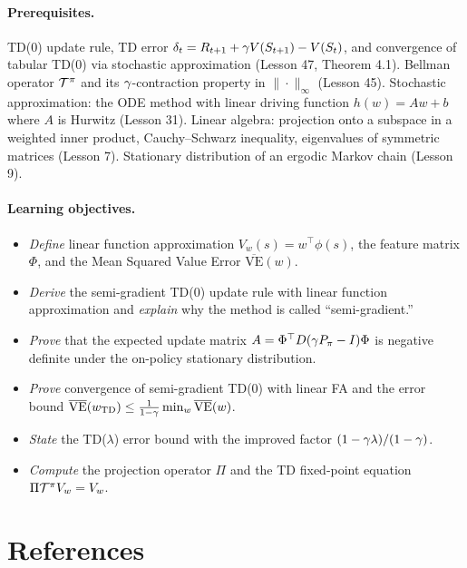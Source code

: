 \documentclass[11pt,a4paper]{article}
\begin{document}
\paragraph{Prerequisites.}
TD(0) update rule, TD error $\delta_t = R_{t+1} + \gamma V(S_{t+1})
- V(S_t)$, and convergence of tabular TD(0) via stochastic approximation
(Lesson 47, Theorem 4.1). Bellman operator $\mathcal{T}^\pi$ and its
$\gamma$-contraction property in $\|\cdot\|_\infty$ (Lesson 45).
Stochastic approximation: the ODE method with linear driving function
$h(w) = Aw + b$ where $A$ is Hurwitz (Lesson 31). Linear algebra:
projection onto a subspace in a weighted inner product, Cauchy--Schwarz
inequality, eigenvalues of symmetric matrices (Lesson 7). Stationary
distribution of an ergodic Markov chain (Lesson 9).

\paragraph{Learning objectives.}
\begin{itemize}
  \item \emph{Define} linear function approximation $V_w(s) = w^\top
    \phi(s)$, the feature matrix $\Phi$, and the Mean Squared Value
    Error $\overline{\mathrm{VE}}(w)$.
  \item \emph{Derive} the semi-gradient TD(0) update rule with linear
    function approximation and \emph{explain} why the method is called
    ``semi-gradient.''
  \item \emph{Prove} that the expected update matrix
    $A = \Phi^\top D(\gamma P_\pi - I)\Phi$ is negative definite
    under the on-policy stationary distribution.
  \item \emph{Prove} convergence of semi-gradient TD(0) with linear FA
    and the error bound
    $\overline{\mathrm{VE}}(w_{\mathrm{TD}}) \leq
    \frac{1}{1-\gamma}\min_w \overline{\mathrm{VE}}(w)$.
  \item \emph{State} the TD($\lambda$) error bound with the improved
    factor $(1-\gamma\lambda)/(1-\gamma)$.
  \item \emph{Compute} the projection operator $\Pi$ and the TD
    fixed-point equation $\Pi \mathcal{T}^\pi V_w = V_w$.
\end{itemize}

\section{References}
\label{sec:references}
\end{document}
